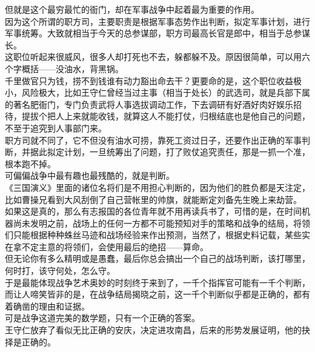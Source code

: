 \begin{multicols}{\theparacolNo}
但就是这个最穷最忙的衙门，却在军事战争中起着最为重要的作用。\\

因为这个所谓的职方司，主要职责是根据军事态势作出判断，拟定军事计划，进行军事统筹。大致就相当于今天的总参谋部，职方司最高长官是郎中，相当于总参谋长。\\

这职位听起来很威风，很多人却打死也不去，躲都躲不及。原因很简单，可以用六个字概括——没油水，背黑锅。\\

千里做官只为钱，捞不到钱谁有动力豁出命去干？更要命的是，这个职位收益极小，风险极大，比如王守仁曾经当过主事（相当于处长）的武选司，就是兵部下属的著名肥衙门，专门负责武将人事选拔调动工作，下去调研有好酒好肉好娱乐招待，提拔个把人上来就能收钱，就算这人不能打仗，归根结底也是他自己的问题，不至于追究到人事部门来。\\

职方司就不同了，它不但没有油水可捞，靠死工资过日子，还要作出正确的军事判断，并据此拟定计划，一旦统筹出了问题，打了败仗追究责任，那是一抓一个准，根本跑不掉。\\

可偏偏战争中最有趣也最残酷的，就是判断。\\

《三国演义》里面的诸位名将们是不用担心判断的，因为他们的胜负都是天注定，比如曹操兄看到大风刮倒了自己营帐里的帅旗，就能断定刘备先生晚上来劫营。\\

如果这是真的，那么有志报国的各位青年就不用再读兵书了，可惜的是，在时间机器尚未发明之前，战场上的任何一方都不可能预知对手的策略和战争的结局，将领们只能根据种种蛛丝马迹和战场经验来作出预测，当然了，根据史料记载，某些实在拿不定主意的将领们，会使用最后的绝招——算命。\\

但无论你有多么精明或是愚蠢，最后你总会搞出一个自己的战场判断，该打哪里，何时打，该守何处，怎么守。\\

于是最能体现战争艺术奥妙的时刻终于来到了，一千个指挥官可能有一千个判断，而让人啼笑皆非的是，在战争结局揭晓之前，这一千个判断似乎都是正确的，都有着确凿的理由和证据。\\

可是战争这道完美的数学题，只有一个正确的答案。\\

王守仁放弃了看似无比正确的安庆，决定进攻南昌，后来的形势发展证明，他的抉择是正确的。\\


\end{multicols}
